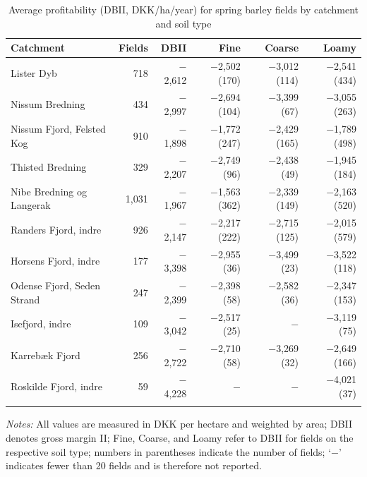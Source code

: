 \documentclass[12pt]{article}
\begin{document}
\begin{table}[H]
\centering
\small
\caption{Average profitability (DBII, DKK/ha/year) for spring barley fields by catchment and soil type}
\label{tab:dbii-vaarbyg}
\begin{threeparttable}
\begin{tabular}{lrrrrr}
\toprule
\textbf{Catchment} & \textbf{Fields} & \textbf{DBII} &
\textbf{Fine} & \textbf{Coarse} & \textbf{Loamy} \\
\midrule\addlinespace
Lister Dyb                 & 718 & $-$2,612 & $-$2,502 (170) & $-$3,012 (114) & $-$2,541 (434) \\
Nissum Bredning            & 434 & $-$2,997 & $-$2,694 (104) & $-$3,399 (67)  & $-$3,055 (263) \\
Nissum Fjord, Felsted Kog  & 910 & $-$1,898 & $-$1,772 (247) & $-$2,429 (165) & $-$1,789 (498) \\
Thisted Bredning           & 329 & $-$2,207 & $-$2,749 (96)  & $-$2,438 (49)  & $-$1,945 (184) \\
Nibe Bredning og Langerak  & 1,031 & $-$1,967 & $-$1,563 (362) & $-$2,339 (149) & $-$2,163 (520) \\
Randers Fjord, indre       & 926 & $-$2,147 & $-$2,217 (222) & $-$2,715 (125) & $-$2,015 (579) \\
Horsens Fjord, indre       & 177 & $-$3,398 & $-$2,955 (36)  & $-$3,499 (23)  & $-$3,522 (118) \\
Odense Fjord, Seden Strand & 247 & $-$2,399 & $-$2,398 (58)  & $-$2,582 (36)  & $-$2,347 (153) \\
Isefjord, indre            & 109 & $-$3,042 & $-$2,517 (25)  & $-$             & $-$3,119 (75) \\
Karrebæk Fjord             & 256 & $-$2,722 & $-$2,710 (58)  & $-$3,269 (32)  & $-$2,649 (166) \\
Roskilde Fjord, indre      & 59  & $-$4,228 & $-$             & $-$             & $-$4,021 (37) \\
\addlinespace\bottomrule
\end{tabular}
\begin{tablenotes}
\footnotesize
\item \textit{Notes:} All values are measured in DKK per hectare and weighted by area;
DBII denotes gross margin II; Fine, Coarse, and Loamy refer to DBII for fields on the
respective soil type; numbers in parentheses indicate the number of fields; `$-$' indicates fewer than 20 fields and is therefore not reported.
\end{tablenotes}
\end{threeparttable}
\end{table}
\end{document}
